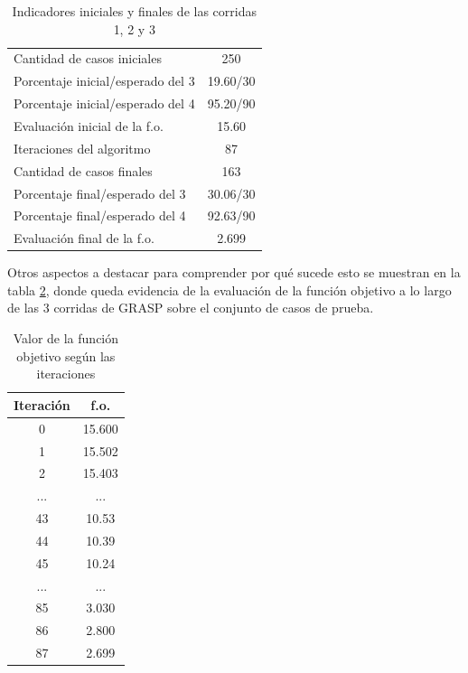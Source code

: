 \documentclass[a4paper,openright,11pt,oneside]{book}
\begin{document}
	\begin{table}[h]
		\begin{center}
			\begin{tabular}{| l | c |} \hline
				Cantidad de casos iniciales & 250 \\
				Porcentaje inicial/esperado del 3 & 19.60/30 \\
				Porcentaje inicial/esperado del 4 & 95.20/90 \\
				Evaluación inicial de la f.o. & 15.60 \\ \hline
				Iteraciones del algoritmo & 87 \\ \hline
				Cantidad de casos finales & 163 \\
				Porcentaje final/esperado del 3 & 30.06/30 \\
				Porcentaje final/esperado del 4 & 92.63/90 \\
				Evaluación final de la f.o. & 2.699 \\ \hline
			\end{tabular}
			\caption{Indicadores iniciales y finales de las corridas 1, 2 y 3}
			\label{tab:IndicadoresGRASP123}
		\end{center}
	\end{table}

	Otros aspectos a destacar para comprender por qué sucede esto se muestran en la tabla \ref{tab:foGRASP123}, donde queda evidencia de la evaluación de la función objetivo a lo largo de las 3 corridas de GRASP sobre el conjunto de casos de prueba.
	
	\begin{table}[h]
		\begin{center}
			\begin{tabular}{| c | c |} \hline
				Iteración & f.o. \\ \hline
				0 & 15.600 \\
				1 & 15.502 \\
				2 & 15.403 \\
				... & ... \\
				43 & 10.53 \\
				44 & 10.39 \\
				45 & 10.24 \\
				... & ... \\
				85 & 3.030 \\
				86 & 2.800 \\
				87 & 2.699 \\ \hline
			\end{tabular}
			\caption{Valor de la función objetivo según las iteraciones}
			\label{tab:foGRASP123}
		\end{center}
	\end{table}
		
\end{document}
